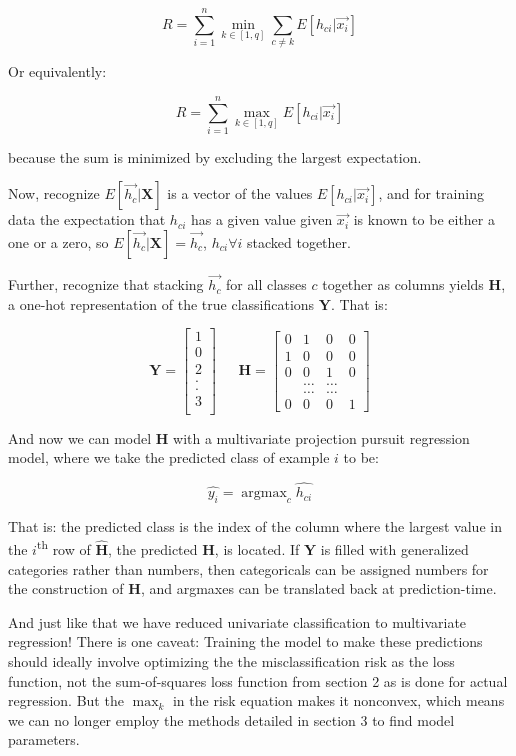 \documentclass[12pt]{article}
\DeclareMathOperator*{\argmax}{argmax}
\begin{document}
$$R = \sum_{i=1}^n \min_{k \in [1,q]} \sum_{c \neq k} E[h_{ci} | \vec{x_i}]$$

Or equivalently:

$$R = \sum_{i=1}^n \max_{k \in [1,q]} E[h_{ci} | \vec{x_i}]$$

because the sum is minimized by excluding the largest expectation.\newline

Now, recognize $E[\vec{h_c} | \pmb{X}]$ is a vector of the values $E[h_{ci} | \vec{x_i}]$, and for training data the expectation that $h_{ci}$ has a given value given $\vec{x_i}$ is known to be either a one or a zero, so $E[\vec{h_c} | \pmb{X}] = \vec{h_c}$, $h_{ci} \forall i$ stacked together.

Further, recognize that stacking $\vec{h_c}$ for all classes $c$ together as columns yields $\pmb{H}$, a one-hot representation of the true classifications $\pmb{Y}$. That is:

\[
\pmb{Y} =
\begin{bmatrix}
1\\
0\\
2\\
.\\
.\\
3\\
\end{bmatrix}
\ \ \ \ \ \ \ \pmb{H} =
\begin{bmatrix}
0 & 1 & 0 & 0\\
1 & 0 & 0 & 0\\
0 & 0 & 1 & 0\\
& \hdots & \hdots\\
& \hdots & \hdots\\
0 & 0 & 0 & 1
\end{bmatrix}
\]

And now we can model $\pmb{H}$ with a multivariate projection pursuit regression model, where we take the predicted class of example $i$ to be:

$$\hat{y_i} = \argmax_c \hat{h_{ci}} $$

That is: the predicted class is the index of the column where the largest value in the $i$\textsuperscript{th} row of $\hat{\pmb{H}}$, the predicted $\pmb{H}$, is located. If $\pmb{Y}$ is filled with generalized categories rather than numbers, then categoricals can be assigned numbers for the construction of $\pmb{H}$, and argmaxes can be translated back at prediction-time.

And just like that we have reduced univariate classification to multivariate regression! There is one caveat: Training the model to make these predictions should ideally involve optimizing the the misclassification risk as the loss function, not the sum-of-squares loss function from section 2 as is done for actual regression. But the $\max_k$ in the risk equation makes it nonconvex, which means we can no longer employ the methods detailed in section 3 to find model parameters.
\end{document}
